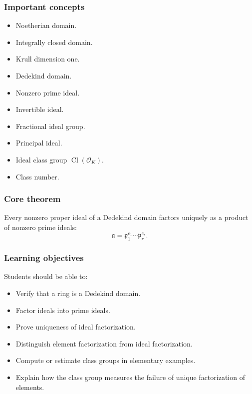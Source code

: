 \documentclass[11pt]{article}
\begin{document}
\subsubsection*{Important concepts}

\begin{itemize}
    \item Noetherian domain.
    \item Integrally closed domain.
    \item Krull dimension one.
    \item Dedekind domain.
    \item Nonzero prime ideal.
    \item Invertible ideal.
    \item Fractional ideal group.
    \item Principal ideal.
    \item Ideal class group \(\operatorname{Cl}(\mathcal{O}_K)\).
    \item Class number.
\end{itemize}

\subsubsection*{Core theorem}

Every nonzero proper ideal of a Dedekind domain factors uniquely as a product
of nonzero prime ideals:
\[
    \mathfrak{a}
    =
    \mathfrak{p}_1^{e_1}\cdots\mathfrak{p}_r^{e_r}.
\]

\subsubsection*{Learning objectives}

Students should be able to:

\begin{itemize}
    \item Verify that a ring is a Dedekind domain.
    \item Factor ideals into prime ideals.
    \item Prove uniqueness of ideal factorization.
    \item Distinguish element factorization from ideal factorization.
    \item Compute or estimate class groups in elementary examples.
    \item Explain how the class group measures the failure of unique
          factorization of elements.
\end{itemize}
\end{document}
